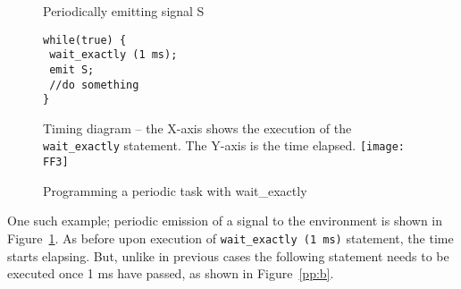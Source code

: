 \begin{figure}[t!]
  \centering
	\vspace{-10pt}
        \begin{SubFloat}{\label{pp:a}Periodically emitting signal S}
        \begin{lstlisting}[style=sysj,morekeywords={emit,trap,pause,exit,wait_exactly}]
while(true) { 
 wait_exactly (1 ms); 
 emit S; 
 //do something 
}
\end{lstlisting}
\end{SubFloat}
\begin{SubFloat}{\label{pp:b}Timing diagram -- the X-axis shows the
    execution of the \texttt{wait\_exactly} statement. The Y-axis is the
    time elapsed.}
  \texttt{[image: FF3]}
\end{SubFloat}
  \caption{Programming a periodic task with wait\_exactly}
  \label{fig:periodic}
  \vspace{-10pt}
\end{figure}

One such example; periodic emission of a signal to the environment is
shown in Figure~\ref{fig:periodic}. As before upon execution of
\texttt{wait\_exactly (1 ms)} statement, the time starts elapsing. But,
unlike in previous cases the following statement needs to be executed
once 1 ms have passed, as shown in Figure~\ref{pp:b}.

